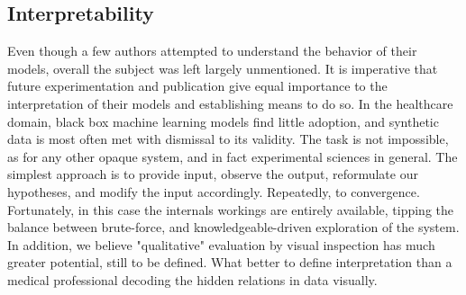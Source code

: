 %
 
\subsection{Interpretability\label{sec:latent-space}}
Even though a few authors attempted to understand the behavior of their models, overall the subject was left largely unmentioned. It is imperative that future experimentation and publication give equal importance to the interpretation of their models and establishing means to do so. In the healthcare domain, black box machine learning models find little adoption, and synthetic data is most often met with dismissal to its validity. The task is not impossible, as for any other opaque system, and in fact experimental sciences in general. The simplest approach is to  provide input, observe the output, reformulate our hypotheses, and modify the input accordingly. Repeatedly, to convergence. Fortunately, in this case the internals workings are entirely available, tipping the balance between brute-force, and knowledgeable-driven exploration of the system. In addition, we believe "qualitative" evaluation by visual inspection has much greater potential, still to be defined. What better to define interpretation than a medical professional decoding the hidden relations in data visually. \par

